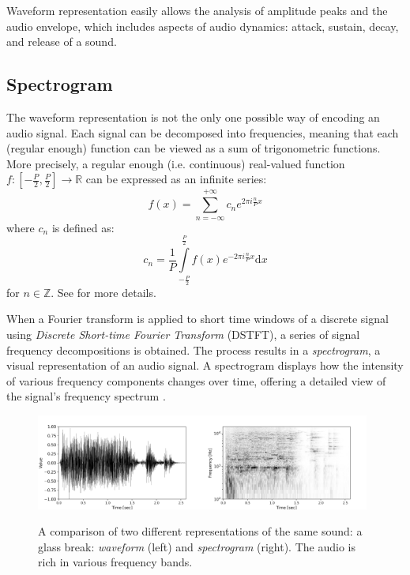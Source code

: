 Waveform representation easily allows the analysis of amplitude peaks and the audio envelope, which includes aspects of audio dynamics: attack, sustain, decay, and release of a sound.

\subsection{Spectrogram}

The waveform representation is not the only one possible way of encoding an audio signal. Each signal can be decomposed into frequencies, meaning that each (regular enough) function can be viewed as a sum of trigonometric functions. More precisely, a regular enough (i.e. continuous) real-valued function $f\colon\left[-\tfrac{P}{2},\tfrac{P}{2}\right]\to\mathbb{R}$ can be expressed as an infinite series: $$f(x) = \sum_{n=-\infty}^{+\infty}c_n e^{2\pi i\frac{n}{P}x}$$ where $c_n$ is defined as: $$c_n = \frac{1}{P}\int\limits_{-\tfrac{P}{2}}^{\tfrac{P}{2}}f(x)e^{-2\pi i \frac{n}{P}x}\mbox{d}x$$ for $n\in\mathbb{Z}$. See \cite[p.~185--186]{Rudin1976} for more details.

When a Fourier transform is applied to short time windows of a discrete signal using \emph{Discrete Short-time Fourier Transform} (DSTFT), a series of signal frequency decompositions is obtained. The process results in a \emph{spectrogram}, a visual representation of an audio signal. A spectrogram displays how the intensity of various frequency components changes over time, offering a detailed view of the signal's frequency spectrum \cite[p.~365--366]{Smith1999}.

\begin{figure}[ht!]
\centering
\includegraphics[width=0.49\textwidth]{images/waveform.png}\includegraphics[width=0.49\textwidth]{images/spectrogram.png}
\caption[A comparison of two different representations of the same sound.]{A comparison of two different representations of the same sound: a glass break: \emph{waveform} (left) and \emph{spectrogram} (right). The audio is rich in various frequency bands.}
\end{figure}

